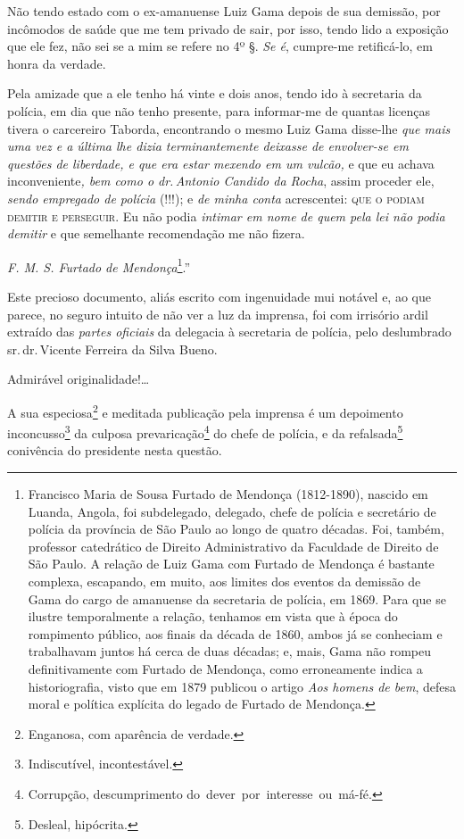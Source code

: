 Não tendo estado com o ex-amanuense Luiz Gama depois de sua demissão,
por incômodos de saúde que me tem privado de sair, por isso, tendo lido
a exposição que ele fez, não sei se a mim se refere no 4º §. \emph{Se
é}, cumpre-me retificá-lo, em honra da verdade.

Pela amizade que a ele tenho há vinte e dois anos, tendo ido à
secretaria da polícia, em dia que não tenho presente, para informar-me
de quantas licenças tivera o carcereiro Taborda, encontrando o mesmo
Luiz Gama disse-lhe \emph{que mais uma vez e a última lhe dizia
terminantemente deixasse de envolver-se em questões de liberdade, e que
era estar mexendo em um vulcão,} e que eu achava inconveniente\emph{,
bem como o dr.\,Antonio Candido da Rocha}, assim proceder ele,
\emph{sendo empregado de polícia} (!!!); e \emph{de minha conta}
acrescentei: \textsc{que o podiam demitir e perseguir}. Eu não podia
\emph{intimar em nome de quem pela lei não podia demitir} e que
semelhante recomendação me não fizera.

\emph{F. M. S. Furtado de Mendonça}\footnote{Francisco Maria de Sousa
  Furtado de Mendonça (1812-1890), nascido em Luanda, Angola, foi
  subdelegado, delegado, chefe de polícia e secretário de polícia da
  província de São Paulo ao longo de quatro décadas. Foi, também,
  professor catedrático de Direito Administrativo da Faculdade de
  Direito de São Paulo. A relação de Luiz Gama com Furtado de Mendonça é
  bastante complexa, escapando, em muito, aos limites dos eventos da
  demissão de Gama do cargo de amanuense da secretaria de polícia, em
  1869. Para que se ilustre temporalmente a relação, tenhamos em vista
  que à época do rompimento público, aos finais da década de 1860, ambos
  já se conheciam e trabalhavam juntos há cerca de duas décadas; e,
  mais, Gama não rompeu definitivamente com Furtado de Mendonça, como
  erroneamente indica a historiografia, visto que em 1879 publicou o
  artigo \emph{Aos homens de bem}, defesa moral e política explícita do
  legado de Furtado de Mendonça.}.''

Este precioso documento, aliás escrito com ingenuidade mui notável e, ao
que parece, no seguro intuito de não ver a luz da imprensa, foi com
irrisório ardil extraído das \emph{partes oficiais} da delegacia à
secretaria de polícia, pelo deslumbrado sr.\,dr.\,Vicente Ferreira da
Silva Bueno.

Admirável originalidade!\ldots{}

A sua especiosa\footnote{Enganosa, com aparência de verdade.} e
meditada publicação pela imprensa é um depoimento inconcusso\footnote{
  Indiscutível, incontestável.} da culposa prevaricação\footnote{
  Corrupção, descumprimento do~dever~por~interesse~ou~má-fé.} do chefe
de polícia, e da refalsada\footnote{Desleal, hipócrita.} conivência do
presidente nesta questão.


